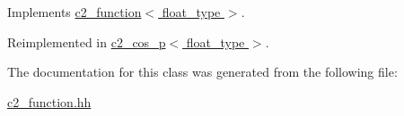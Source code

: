 Implements \hyperlink{classc2__function_a44e0201159111350be7f746fc9026f67}{c2\+\_\+function$<$ float\+\_\+type $>$}.



Reimplemented in \hyperlink{classc2__cos__p_ae4e275f2739d33bfbf1f2efc741535d5}{c2\+\_\+cos\+\_\+p$<$ float\+\_\+type $>$}.



The documentation for this class was generated from the following file\+:\begin{DoxyCompactItemize}
\item 
\hyperlink{c2__function_8hh}{c2\+\_\+function.\+hh}\end{DoxyCompactItemize}
